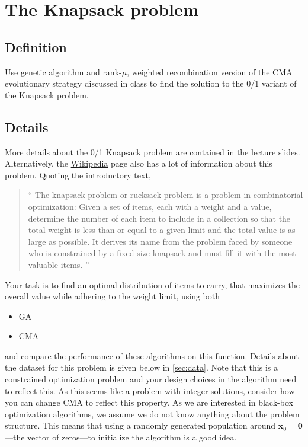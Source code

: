 \documentclass[11pt]{article}
\begin{document}
\section{The Knapsack problem}
\label{sec:org8983cac}
\subsection{Definition}
\label{sec:org8d8ae40}
  Use genetic algorithm and rank-\(\mu\), weighted recombination version of the CMA
evolutionary strategy discussed in class to find the solution to the 0/1 variant of
the Knapsack problem.
\subsection{Details}
\label{sec:orgc0123f9}
More details about the 0/1 Knapsack problem are contained in the lecture slides.
Alternatively, the \href{https://en.wikipedia.org/wiki/Knapsack\_problem}{Wikipedia} page also has a lot of information about this
problem. Quoting the introductory text,
\begin{quote}
`` The knapsack problem or rucksack problem is a problem in combinatorial
optimization: Given a set of items, each with a weight and a value, determine
the number of each item to include in a collection so that the total weight is
less than or equal to a given limit and the total value is as large as possible.
It derives its name from the problem faced by someone who is constrained by a
fixed-size knapsack and must fill it with the most valuable items. ''
\end{quote}

Your task is to find an optimal distribution of items to carry, that
maximizes the overall value while adhering to the weight limit, using both
\begin{itemize}
\item GA
\item CMA
\end{itemize}
and compare the performance of these algorithms on this function. Details about
the dataset for this problem is given below in \cref{sec:data}. Note that this is a constrained
optimization problem and your design choices in the
algorithm need to reflect this. As this seems like a problem with integer
solutions, consider how you can change CMA to reflect this property. As we are
interested in black-box optimization algorithms, we assume we do not know
anything about the problem structure. This means that using a randomly generated
population around \(\mathbf{x}_0 =\mathbf{0}\)---the vector of zeros---to
initialize the algorithm is a good idea.
\end{document}
